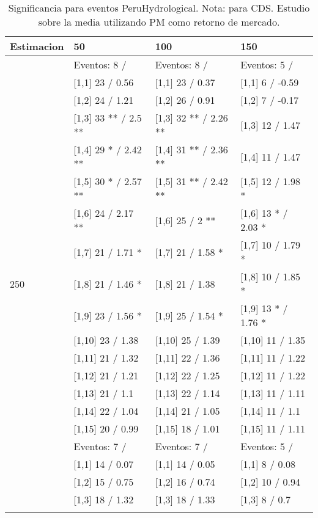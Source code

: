 \begin{table}

\caption{Significancia para eventos PeruHydrological. Nota: para CDS. Estudio sobre la media utilizando PM como retorno de mercado.}
\centering
\begin{tabular}[t]{llll}
\toprule
Estimacion & 50 & 100 & 150\\
\midrule
 & Eventos:  8 / & Eventos:  8 / & Eventos:  5 /\\
 & {}[1,1] 23  / 0.56 & {}[1,1] 23  / 0.37 & {}[1,1] 6  / -0.59\\
 & {}[1,2] 24  / 1.21 & {}[1,2] 26  / 0.91 & {}[1,2] 7  / -0.17\\
 & {}[1,3] 33 ** / 2.5 ** & {}[1,3] 32 ** / 2.26 ** & {}[1,3] 12  / 1.47\\
 & {}[1,4] 29 * / 2.42 ** & {}[1,4] 31 ** / 2.36 ** & {}[1,4] 11  / 1.47\\
\addlinespace
 & {}[1,5] 30 * / 2.57 ** & {}[1,5] 31 ** / 2.42 ** & {}[1,5] 12  / 1.98 *\\
 & {}[1,6] 24  / 2.17 ** & {}[1,6] 25  / 2 ** & {}[1,6] 13 * / 2.03 *\\
 & {}[1,7] 21  / 1.71 * & {}[1,7] 21  / 1.58 * & {}[1,7] 10  / 1.79 *\\
250 & {}[1,8] 21  / 1.46 * & {}[1,8] 21  / 1.38 & {}[1,8] 10  / 1.85 *\\
 & {}[1,9] 23  / 1.56 * & {}[1,9] 25  / 1.54 * & {}[1,9] 13 * / 1.76 *\\
\addlinespace
 & {}[1,10] 23  / 1.38 & {}[1,10] 25  / 1.39 & {}[1,10] 11  / 1.35\\
 & {}[1,11] 21  / 1.32 & {}[1,11] 22  / 1.36 & {}[1,11] 11  / 1.22\\
 & {}[1,12] 21  / 1.21 & {}[1,12] 22  / 1.25 & {}[1,12] 11  / 1.22\\
 & {}[1,13] 21  / 1.1 & {}[1,13] 22  / 1.14 & {}[1,13] 11  / 1.11\\
 & {}[1,14] 22  / 1.04 & {}[1,14] 21  / 1.05 & {}[1,14] 11  / 1.1\\
\addlinespace
 & {}[1,15] 20  / 0.99 & {}[1,15] 18  / 1.01 & {}[1,15] 11  / 1.11\\
 & Eventos:  7 / & Eventos:  7 / & Eventos:  5 /\\
 & {}[1,1] 14  / 0.07 & {}[1,1] 14  / 0.05 & {}[1,1] 8  / 0.08\\
 & {}[1,2] 15  / 0.75 & {}[1,2] 16  / 0.74 & {}[1,2] 10  / 0.94\\
 & {}[1,3] 18  / 1.32 & {}[1,3] 18  / 1.33 & {}[1,3] 8  / 0.7\\
\addlinespace

\end{tabular}
\end{table}

